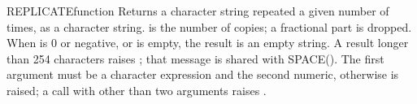 \begin{XbaseEntry}{REPLICATE}{function}
Returns a character string repeated a given number of times, as a character string.
\Syntax
{}
\Usage
{} is the number of copies; a fractional part is dropped. When  is 0 or negative, or  is empty, the result is an empty string. A result longer than 254 characters raises ; that message is shared with SPACE(). The first argument must be a character expression and the second numeric, otherwise  is raised; a call with other than two arguments raises .
\Examples
{}
\end{XbaseEntry}

